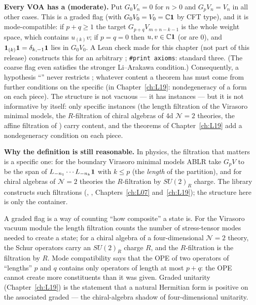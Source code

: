 \begin{warning}
\textbf{Every VOA has a  (moderate).} Put $G_0V_n = 0$ for $n>0$ and $G_pV_n = V_n$
in all other cases. This is a graded flag (with $G_0V_0 = V_0 = {\mathbb{C}}\mathbf{1}$ by CFT type), and it is
mode-compatible: if $p+q\ge1$ the target $G_{p+q}V_{m+n-k-1}$ is the whole weight space, which
contains $u_{(k)}v$; if $p=q=0$ then $u,v\in{\mathbb{C}}\mathbf{1}$ (or are $0$), and
$\mathbf{1}_{(k)}\mathbf{1} = \delta_{k,-1}\mathbf{1}$ lies in $G_0V_0$. A Lean check made for this chapter (not part of this release) constructs this
 for an arbitrary ; \texttt{\#print axioms}: standard three. (The coarse
flag even satisfies the stronger Li--Arakawa condition.) Consequently, a hypothesis
``'' never restricts ; whatever content a theorem has must come from
further conditions on the specific  (in Chapter~\ref{ch:L19}: nondegeneracy of a form on each
piece). The structure is not vacuous --- it has instances --- but it is not informative by itself: only specific instances (the
length filtration of the Virasoro minimal models, the $R$-filtration of chiral algebras of 4d $\mathcal N=2$ theories, the affine
filtration of ) carry content, and the theorems of Chapter~\ref{ch:L19} add a
nondegeneracy condition on each piece.
\end{warning}

\textbf{Why the definition is still reasonable.} In physics, the filtration that matters is a specific
one: for the boundary Virasoro minimal models ABLR take $G_pV$ to be the span of
$L_{-n_1}\cdots L_{-n_k}\mathbf{1}$ with $k\le p$ (the \emph{length} of the partition), and for chiral
algebras of $\mathcal N=2$ theories the $R$-filtration by $SU(2)_R$ charge. The library constructs such
filtrations (,
, Chapters~\ref{ch:L07} and~\ref{ch:L19}); the structure here is
only the container.

\begin{physics}
A graded flag is a way of counting ``how composite'' a state is. For the Virasoro vacuum module the
length filtration counts the number of stress-tensor modes needed to create a state; for a chiral
algebra of a four-dimensional $\mathcal N=2$ theory, the Schur operators carry an $SU(2)_R$ charge $R$,
and the $R$-filtration is the filtration by $R$. Mode compatibility says that the OPE of two operators
of ``lengths'' $p$ and $q$ contains only operators of length at most $p+q$: the OPE cannot create more
constituents than it was given. Graded unitarity (Chapter~\ref{ch:L19}) is the statement that a natural
Hermitian form is positive on the associated graded --- the chiral-algebra shadow of four-dimensional
unitarity.
\end{physics}

